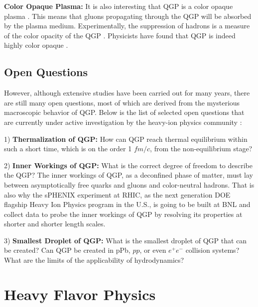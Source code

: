 \textbf{Color Opaque Plasma:} It is also interesting that QGP is a color opaque plasma \cite{QGPGen}. This means that gluons propagating through the QGP will be absorbed by the plasma medium. Experimentally, the suppression of hadrons is a measure of the color opacity of the QGP \cite{QGPGen}. Physicists have found that QGP is indeed highly color opaque \cite{QGPOpaque}.




 


\subsection{Open Questions}

However, although extensive studies have been carried out for many years, there are still many open questions, most of which are derived from the mysterious macroscopic behavior of QGP. Below is the list of selected open questions that are currently under active investigation by the heavy-ion physics community \cite{BigQuestions}:

1) \textbf{Thermalization of QGP:} How can QGP reach thermal equilibrium within such a short time, which is on the order 1 $fm/c$, from the non-equilibrium stage?

2) \textbf{Inner Workings of QGP:} What is the correct degree of freedom to describe the QGP? The inner workings of QGP, as a deconfined phase of matter, must lay between asymptotically free quarks and gluons and color-neutral hadrons. That is also why the sPHENIX experiment at RHIC, as the next generation DOE flagship Heavy Ion Physics program in the U.S., is going to be built at BNL and collect data to probe the inner workings of QGP by resolving its properties at shorter and shorter length scales. 

3) \textbf{Smallest Droplet of QGP:} What is the smallest droplet of QGP that can be created? Can QGP be created in pPb, $pp$, or even $e^+e^-$ collision systems? What are the limits of the applicability of hydrodynamics?

\section{Heavy Flavor Physics}


